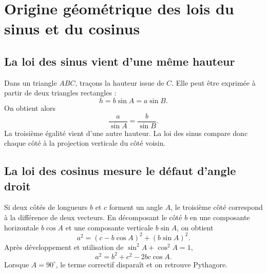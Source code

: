 \documentclass[12pt,a4paper,openany]{book}
\begin{document}
\section{Origine géométrique des lois du sinus et du cosinus}

\subsection{La loi des sinus vient d'une même hauteur}
Dans un triangle $ABC$, traçons la hauteur issue de $C$. Elle peut être exprimée à partir de deux triangles rectangles :
\[
h=b\sin A=a\sin B.
\]
On obtient alors
\[
\frac a{\sin A}=\frac b{\sin B}.
\]
La troisième égalité vient d'une autre hauteur. La loi des sinus compare donc chaque côté à la projection verticale du côté voisin.

\begin{center}
\end{center}

\subsection{La loi des cosinus mesure le défaut d'angle droit}
Si deux côtés de longueurs $b$ et $c$ forment un angle $A$, le troisième côté correspond à la différence de deux vecteurs. En décomposant le côté $b$ en une composante horizontale $b\cos A$ et une composante verticale $b\sin A$, on obtient
\[
a^2=(c-b\cos A)^2+(b\sin A)^2.
\]
Après développement et utilisation de $\sin^2A+\cos^2A=1$,
\[
a^2=b^2+c^2-2bc\cos A.
\]
Lorsque $A=90^\circ$, le terme correctif disparaît et on retrouve Pythagore.

\begin{center}
\end{center}
\end{document}
